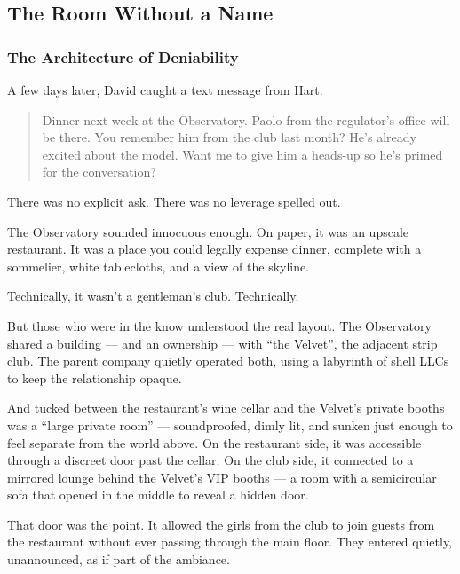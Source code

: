 \subsection{The Room Without a Name}

\subsubsection{The Architecture of Deniability}

A few days later, David caught a text message from Hart.

\begin{quote}
  Dinner next week at the Observatory. Paolo from the regulator’s office will be there. You remember him from the club 
  last month? He’s already excited about the model. Want me to give him a heads-up so he’s primed for the conversation?
\end{quote}

There was no explicit ask. There was no leverage spelled out.

The Observatory sounded innocuous enough. On paper, it was an upscale restaurant. It was a place you could legally expense 
dinner, complete with a sommelier, white tablecloths, and a view of the skyline.  

Technically, it wasn’t a gentleman’s club. Technically.

But those who were in the know understood the real layout. The Observatory shared a building --- and an ownership --- with 
``the Velvet'', the adjacent strip club. The parent company quietly operated both, using a labyrinth of shell 
LLCs to keep the relationship opaque.

And tucked between the restaurant’s wine cellar and the Velvet’s private booths was a “large private room” — soundproofed, 
dimly lit, and sunken just enough to feel separate from the world above. On the restaurant side, it was accessible through 
a discreet door past the cellar. On the club side, it connected to a mirrored lounge behind the Velvet’s VIP booths — a 
room with a semicircular sofa that opened in the middle to reveal a hidden door.

That door was the point. It allowed the girls from the club to join guests from the restaurant without ever passing through 
the main floor. They entered quietly, unannounced, as if part of the ambiance. 

\medskip

